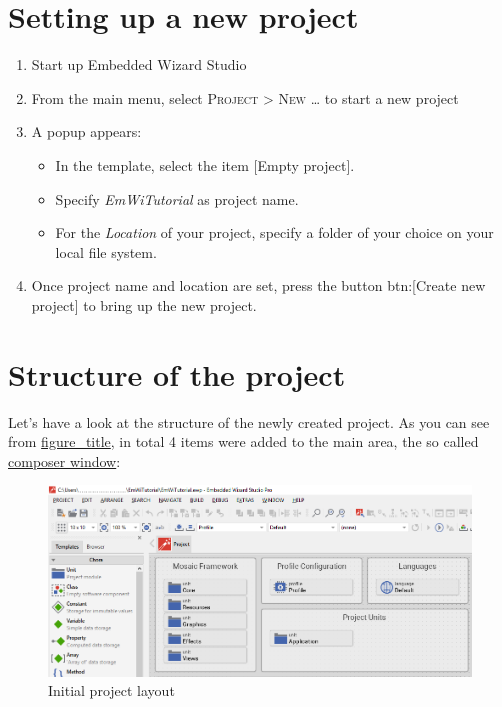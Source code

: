 \documentclass[
  a4paper,
,tablecaptionabove
]{scrbook}
\begin{document}
\hypertarget{_setting_up_a_new_project}{%
\section{Setting up a new project}\label{_setting_up_a_new_project}}

\begin{enumerate}
\def\labelenumi{\arabic{enumi}.}
\item
  Start up Embedded Wizard Studio
\item
  From the main menu, select \textsc{Project > New \ldots}​ to start a
  new project
\item
  A popup appears:

  \begin{itemize}
  \item
    In the template, select the item {[}Empty project{]}.
  \item
    Specify \emph{EmWiTutorial} as project name.
  \item
    For the \emph{Location} of your project, specify a folder of your
    choice on your local file system.
  \end{itemize}
\item
  Once project name and location are set, press the button btn:{[}Create
  new project{]} to bring up the new project.
\end{enumerate}

\hypertarget{_structure_of_the_project}{%
\section{Structure of the project}\label{_structure_of_the_project}}

Let's have a look at the structure of the newly created project. As you
can see from \protect\hyperlink{fig:ProjectLayout}{figure\_title}, in
total 4 items were added to the main area, the so called
\href{https://doc.embedded-wizard.de/composer-window}{composer window}:

\begin{figure}
\centering
\includegraphics{./../asciidoc/modules/ROOT/assets/images/helloworld/InitialProject.png}
\caption{Initial project layout}
\end{figure}
\end{document}
